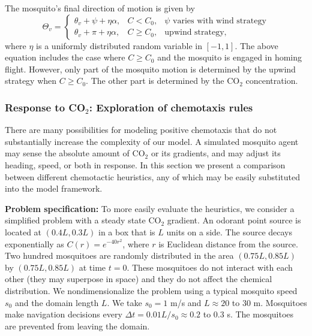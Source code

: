 \documentclass[12pt]{article}
\begin{document}
	The mosquito's final direction of motion is given by
	\begin{equation}\label{eqn:thetav}
	\Theta_v =  \left\{\begin{matrix}\theta_v + \psi + \eta\alpha, & C < C_0, & \text{$\psi$ varies with wind strategy} \\  \theta_v + \pi + \eta\alpha, & C \geq C_0, & \text{upwind strategy,} \qquad \qquad \: \: \: \end{matrix} \right. 
\end{equation}
	where $\eta$ is a uniformly distributed random variable in $[-1,1]$. The above equation includes the case where $C \geq C_0$ and the mosquito is engaged in homing flight. However, only part of the mosquito motion is determined by the upwind strategy when $C \geq C_0$. The other part is determined by the CO$_2$ concentration.
	
	
	\subsubsection{Response to CO$_2$: Exploration of chemotaxis rules}\label{sec:chemostats}
	
	There are many possibilities for modeling positive chemotaxis that do not substantially increase the complexity of our model. A simulated mosquito agent may sense the absolute amount of CO$_2$ or its gradients, and may adjust its heading, speed, or both in response. In this section we present a comparison between different chemotactic heuristics, any of which may be easily substituted into the model framework. 
	
	\textbf{Problem specification:} To more easily evaluate the heuristics, we consider a simplified problem with a steady state CO$_2$ gradient. An odorant point source is located at $(0.4L,0.3L)$ in a box that is $L$ units on a side. The source decays exponentially as $C(r) = e^{-40r^2}$, where $r$ is Euclidean distance from the source. Two hundred mosquitoes are randomly distributed in the area $(0.75L,0.85L)$ by $(0.75L,0.85L)$ at time $t=0$. These mosquitoes do not interact with each other (they may superpose in space) and they do not affect the chemical distribution. We nondimensionalize the problem using a typical mosquito speed $s_0$ and the domain length $L$. We take $s_0 = 1$ m/s and $L \approx 20$ to $30$ m. Mosquitoes make navigation decisions every $\Delta t = 0.01L/s_0 \approx 0.2$ to $0.3$ s. The mosquitoes are prevented from leaving the domain. 
	
\end{document}

